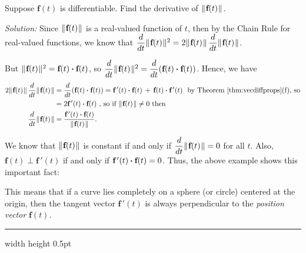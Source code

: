 \begin{exmp}\label{exmp:absvecderiv}
 Suppose $\textbf{f}(t)$ is differentiable. Find the derivative of $\lVert\mspace{1mu}\textbf{f}(t)\mspace{1mu}\rVert$.
 \smallskip
 \par\noindent \emph{Solution:} Since $\lVert\mspace{1mu}\textbf{f}(t)\mspace{1mu}\rVert$ is a real-valued function of $t$, then by the Chain
 Rule for real-valued functions, we know that
  $\dfrac{d}{dt} \lVert\mspace{1mu}\textbf{f}(t)\mspace{1mu}\rVert^2 = 2 \lVert\mspace{1mu}\textbf{f}(t)\mspace{1mu}\rVert \, \dfrac{d}{dt} \lVert\mspace{1mu}\textbf{f}(t)\mspace{1mu}\rVert$.

 \par\noindent But $\lVert\mspace{1mu}\textbf{f}(t)\mspace{1mu}\rVert^2 = \textbf{f}(t) \bm{\cdot} \textbf{f}(t)$, so
 $\dfrac{d}{dt} \lVert\mspace{1mu}\textbf{f}(t)\mspace{1mu}\rVert^2 = \dfrac{d}{dt} ( \textbf{f}(t) \bm{\cdot} \textbf{f}(t) )$.
 Hence, we have
 \begin{align*}
  2 \lVert\mspace{1mu}\textbf{f}(t)\mspace{1mu}\rVert\,\dfrac{d}{dt} \lVert\mspace{1mu}\textbf{f}(t)\mspace{1mu}\rVert &= \dfrac{d}{dt} (\textbf{f}(t) \bm{\cdot} \textbf{f}(t))
  = \textbf{f}\,'(t) \bm{\cdot} \textbf{f}(t) \, + \, \textbf{f}(t) \bm{\cdot} \textbf{f}\,'(t)
   \text{~~by Theorem \ref{thm:vecdiffprops}(f), so}\\
  &= 2 \textbf{f}\,'(t) \bm{\cdot} \textbf{f}(t) \text{~,~so if $\lVert\mspace{1mu}\textbf{f}(t)\mspace{1mu}\rVert \ne 0$ then}\\
  \dfrac{d}{dt} \lVert\mspace{1mu}\textbf{f}(t)\mspace{1mu}\rVert &= \dfrac{\textbf{f}\,'(t) \bm{\cdot} \textbf{f}(t)}{\lVert\mspace{1mu}\textbf{f}(t)\mspace{1mu}\rVert} .
 \end{align*}

We know that $\lVert\mspace{1mu}\textbf{f}(t)\mspace{1mu}\rVert$ is constant if and only if $\dfrac{d}{dt} \lVert\mspace{1mu}\textbf{f}(t)\mspace{1mu}\rVert = 0$ for all $t$.
Also, $\textbf{f}(t) \perp \textbf{f}\,'(t)$ if and only if $\textbf{f}\,'(t) \bm{\cdot} \textbf{f}(t) = 0$. Thus, the
above example shows this important fact:
\begin{center}\end{center}
This means that if a curve lies completely on a sphere (or circle) centered at the origin, then the tangent vector
$\textbf{f}\,'(t)$ is always perpendicular to the \emph{position vector} $\textbf{f}(t)$.
\end{exmp}
\hrule width \textwidth height 0.5pt
